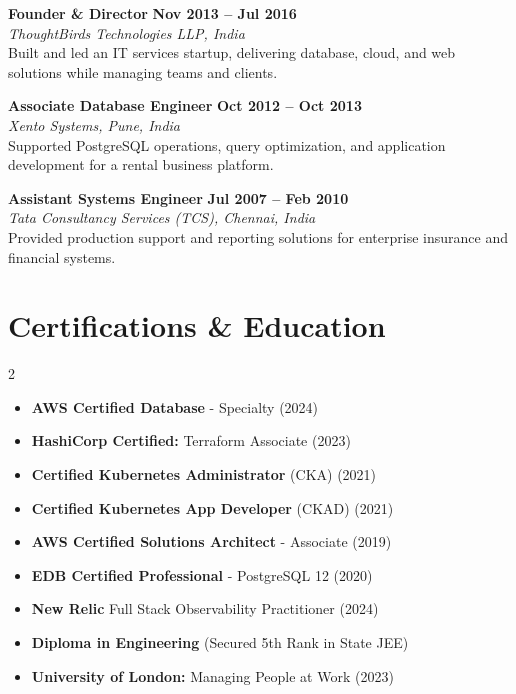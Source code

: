 \documentclass[10pt,a4paper]{article}
\begin{document}
\vspace{3pt}
\noindent
\textbf{Founder \& Director} \hfill \textbf{Nov 2013 -- Jul 2016} \\
\emph{ThoughtBirds Technologies LLP, India} \\
Built and led an IT services startup, delivering database, cloud, and web solutions while managing teams and clients.

\vspace{3pt}
\noindent
\textbf{Associate Database Engineer} \hfill \textbf{Oct 2012 -- Oct 2013} \\
\emph{Xento Systems, Pune, India} \\
Supported PostgreSQL operations, query optimization, and application development for a rental business platform.

\vspace{3pt}
\noindent
\textbf{Assistant Systems Engineer} \hfill \textbf{Jul 2007 -- Feb 2010} \\
\emph{Tata Consultancy Services (TCS), Chennai, India} \\
Provided production support and reporting solutions for enterprise insurance and financial systems.

\section{Certifications \& Education}
\begin{multicols}{2}
    \begin{itemize}[leftmargin=*, noitemsep]
        \item \textbf{AWS Certified Database} - Specialty (2024)
        \item \textbf{HashiCorp Certified:} Terraform Associate (2023)
        \item \textbf{Certified Kubernetes Administrator} (CKA) (2021)
        \item \textbf{Certified Kubernetes App Developer} (CKAD) (2021)
        \item \textbf{AWS Certified Solutions Architect} - Associate (2019)
        \item \textbf{EDB Certified Professional} - PostgreSQL 12 (2020)
        \item \textbf{New Relic} Full Stack Observability Practitioner (2024)
        \item \textbf{Diploma in Engineering} (Secured 5th Rank in State JEE)
        \item \textbf{University of London:} Managing People at Work (2023)
    \end{itemize}
\end{multicols}
\end{document}
